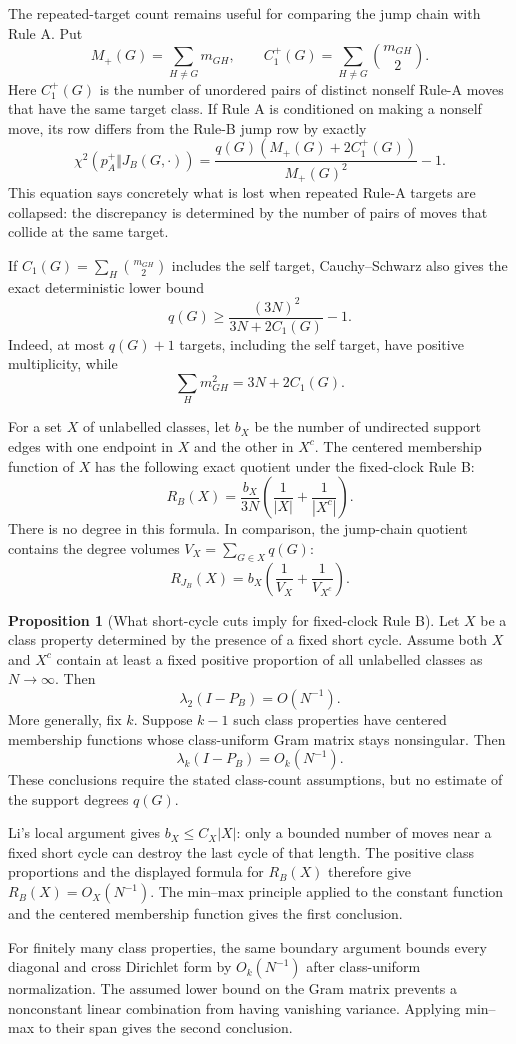 \documentclass[11pt]{article}
\makeatletter
\theoremstyle{definition}
\newtheorem{proposition}[theorem]{Proposition}
\renewenvironment{proof}[1][\proofname]{\par
  \pushQED{\qed}%
  \normalfont \topsep6\p@\@plus6\p@\relax
  \trivlist
  \item[\hskip\labelsep\bfseries #1\@addpunct{.}]\ignorespaces
}{%
  \popQED\endtrivlist\@endpefalse
}
\makeatother
\begin{document}
The repeated-target count remains useful for comparing the jump chain with
Rule A.  Put
\[
 M_+(G)=\sum_{H\ne G}m_{GH},\qquad
 C_1^+(G)=\sum_{H\ne G}\binom{m_{GH}}2.
\]
Here $C_1^+(G)$ is the number of unordered pairs of distinct nonself Rule-A
moves that have the same target class.  If Rule A is conditioned on making a
nonself move, its row differs from the Rule-B jump row by exactly
\[
 \chi^2(p_A^+\Vert J_B(G,\cdot))
 =\frac{q(G)(M_+(G)+2C_1^+(G))}{M_+(G)^2}-1.
\]
This equation says concretely what is lost when repeated Rule-A targets are
collapsed: the discrepancy is determined by the number of pairs of moves that
collide at the same target.

If $C_1(G)=\sum_H\binom{m_{GH}}2$ includes the self target, Cauchy--Schwarz
also gives the exact deterministic lower bound
\[
 q(G)\ge
 \frac{(3N)^2}{3N+2C_1(G)}-1.
\]
Indeed, at most $q(G)+1$ targets, including the self target, have positive
multiplicity, while
\[
 \sum_Hm_{GH}^2=3N+2C_1(G).
\]

For a set $X$ of unlabelled classes, let $b_X$ be the number of undirected
support edges with one endpoint in $X$ and the other in $X^c$.  The centered
membership function of $X$ has the following exact quotient under the
fixed-clock Rule B:
\[
 R_B(X)=\frac{b_X}{3N}
 \left(\frac1{|X|}+\frac1{|X^c|}\right).
\]
There is no degree in this formula.  In comparison, the jump-chain quotient
contains the degree volumes $V_X=\sum_{G\in X}q(G)$:
\[
 R_{J_B}(X)=b_X\left(\frac1{V_X}+\frac1{V_{X^c}}\right).
\]

\begin{proposition}[What short-cycle cuts imply for fixed-clock Rule B]
Let $X$ be a class property determined by the presence of a fixed short cycle.
Assume both $X$ and $X^c$ contain at least a fixed positive proportion of all
unlabelled classes as $N\to\infty$.  Then
\[
 \lambda_2(I-P_B)=O(N^{-1}).
\]
More generally, fix $k$.  Suppose $k-1$ such class properties have centered
membership functions whose class-uniform Gram matrix stays nonsingular.  Then
\[
 \lambda_k(I-P_B)=O_k(N^{-1}).
\]
These conclusions require the stated class-count assumptions, but no estimate
of the support degrees $q(G)$.
\end{proposition}

\begin{proof}
Li's local argument gives $b_X\le C_X|X|$: only a bounded number of moves near
a fixed short cycle can destroy the last cycle of that length.  The positive
class proportions and the displayed formula for $R_B(X)$ therefore give
$R_B(X)=O_X(N^{-1})$.  The min--max principle applied to the constant function
and the centered membership function gives the first conclusion.

For finitely many class properties, the same boundary argument bounds every
diagonal and cross Dirichlet form by $O_k(N^{-1})$ after class-uniform
normalization.  The assumed lower bound on the Gram matrix prevents a
nonconstant linear combination from having vanishing variance.  Applying
min--max to their span gives the second conclusion.
\end{proof}
\end{document}
